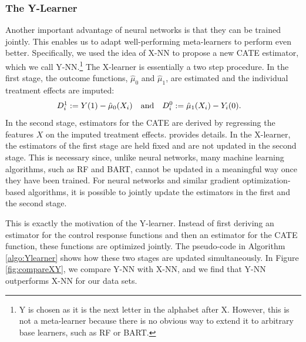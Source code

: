 \subsubsection*{The Y-Learner}
Another important advantage of neural networks is that they can be trained jointly. This enables us to adapt well-performing meta-learners to perform even better. 
Specifically, we used the idea of X-NN to propose %
a new CATE estimator, which we call Y-NN.\footnote{Y is chosen as it is the next letter in the alphabet after X. However, this is not a meta-learner because there is no obvious way to extend it to arbitrary base learners, such as RF or BART.}
The X-learner is essentially a two step procedure.
In the first stage, the outcome functions, $\hat \mu_0$ and $\hat \mu_1$, are estimated and the individual treatment effects are imputed: 
\begin{align*}
&D_i^1 := Y(1) - \hat \mu_0(X_i)& &\mbox{and} &D_i^0 := \hat \mu_1(X_i) - Y_i(0).& 
\end{align*}
In the second stage, estimators for the CATE are derived by regressing the features $X$ on the imputed treatment effects. \cite{kunzel2017meta} provides details. In the X-learner, the estimators of the first stage are held fixed and are not updated in the second stage. This is necessary since, unlike neural networks, many machine learning algorithms, such as RF and BART, cannot be updated in a meaningful way once they have been trained. For neural networks and similar gradient optimization-based algorithms, it is possible to jointly update the estimators in the first and the second stage. 

This is exactly the motivation of the Y-learner. Instead of first deriving an estimator for the control response functions and then an estimator for the CATE function, these functions are optimized jointly. The pseudo-code in Algorithm \ref{algo:Ylearner} shows how these two stages are updated simultaneously. 
In Figure \ref{fig:compareXY}, we compare Y-NN with X-NN, and we find that Y-NN outperforms X-NN for our data sets.
